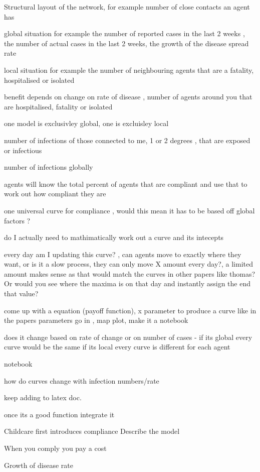 \documentclass{article}
\begin{document}
Structural layout of the network, for example number of close contacts an agent has 

global situation for example the number of reported cases in the last 2 weeks , the number of actual cases in the last 2 weeks, the growth of the disease spread rate

local situation for example the number of neighbouring agents that are a fatality, hospitalised or isolated


benefit depends on change on rate of disease , number of agents around you that are hospitalised, fatality or isolated

one model is exclusivley global, one is excluisley local


number of infections of those connected to me, 1 or 2 degrees , that are exposed or infectious

number of infections globally


agents will know the total percent of agents that are compliant and use that to work out how compliant they are

one universal curve for compliance , would this mean it has to be based off global factors ?

do I actually need to mathimatically work out a curve and its intecepts 

every day am I updating this curve? , can agents move to exactly where they want, or is it a slow process, they can only move X amount every day?, a limited amount makes sense as that would match the curves in other papers like thomas?
Or would you see where the maxima is on that day and instantly assign the end that value?

come up with a equation (payoff function), x parameter to produce a curve like in the papers
parameters go in , map plot, make it a notebook

does it change based on rate of change or on number of cases - if its global every curve would be the same
if its local every curve is different for each agent

notebook

how do curves change with infection numbers/rate

keep adding to latex doc.

once its a good function integrate it 

Childcare first introduces compliance
Describe the model
 
When you comply you pay a cost

Growth of disease rate
\end{document}
